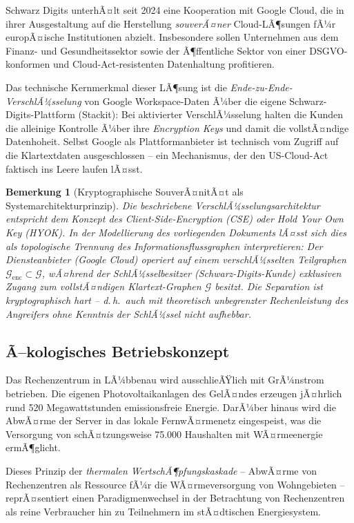 ﻿\documentclass[12pt, a4paper, openany]{report}
\newtheorem{remark}[theorem]{Bemerkung}
\newcommand{\calG}{\mathcal{G}}
\begin{document}
Schwarz Digits unterhÃ¤lt seit 2024 eine Kooperation mit Google Cloud, die
in ihrer Ausgestaltung auf die Herstellung \emph{souverÃ¤ner} Cloud-LÃ¶sungen
fÃ¼r europÃ¤ische Institutionen abzielt. Insbesondere sollen Unternehmen
aus dem Finanz- und Gesundheitssektor sowie der Ã¶ffentliche Sektor
von einer DSGVO-konformen und Cloud-Act-resistenten Datenhaltung profitieren.

Das technische Kernmerkmal dieser LÃ¶sung ist die \emph{Ende-zu-Ende-VerschlÃ¼sselung}
von Google Workspace-Daten Ã¼ber die eigene Schwarz-Digits-Plattform (Stackit):
Bei aktivierter VerschlÃ¼sselung halten die Kunden die alleinige Kontrolle
Ã¼ber ihre \textit{Encryption Keys} und damit die vollstÃ¤ndige Datenhoheit.
Selbst Google als Plattformanbieter ist technisch vom Zugriff auf die
Klartextdaten ausgeschlossen -- ein Mechanismus, der den US-Cloud-Act
faktisch ins Leere laufen lÃ¤sst.

\begin{remark}[Kryptographische SouverÃ¤nitÃ¤t als Systemarchitekturprinzip]
	\label{rem:crypto_sovereignty}
	Die beschriebene VerschlÃ¼sselungsarchitektur entspricht dem Konzept des
	\emph{Client-Side-Encryption} (CSE) oder \emph{Hold Your Own Key} (HYOK).
	In der Modellierung des vorliegenden Dokuments lÃ¤sst sich dies als
	topologische Trennung des Informationsflussgraphen interpretieren: Der
	Diensteanbieter (Google Cloud) operiert auf einem verschlÃ¼sselten
	Teilgraphen $\calG_{\text{enc}} \subset \calG$, wÃ¤hrend der
	SchlÃ¼sselbesitzer (Schwarz-Digits-Kunde) exklusiven Zugang zum
	vollstÃ¤ndigen Klartext-Graphen $\calG$ besitzt. Die Separation ist
	kryptographisch hart -- d.\,h.\ auch mit theoretisch unbegrenzter
	Rechenleistung des Angreifers ohne Kenntnis der SchlÃ¼ssel nicht aufhebbar.
\end{remark}

\subsection{Ã–kologisches Betriebskonzept}

Das Rechenzentrum in LÃ¼bbenau wird ausschlieÃŸlich mit GrÃ¼nstrom betrieben.
Die eigenen Photovoltaikanlagen des GelÃ¤ndes erzeugen jÃ¤hrlich rund
520 Megawattstunden emissionsfreie Energie. DarÃ¼ber hinaus wird die AbwÃ¤rme
der Server in das lokale FernwÃ¤rmenetz eingespeist, was die Versorgung von
schÃ¤tzungsweise 75.000 Haushalten mit WÃ¤rmeenergie ermÃ¶glicht.

Dieses Prinzip der \emph{thermalen WertschÃ¶pfungskaskade} -- AbwÃ¤rme von
Rechenzentren als Ressource fÃ¼r die WÃ¤rmeversorgung von Wohngebieten --
reprÃ¤sentiert einen Paradigmenwechsel in der Betrachtung von Rechenzentren
als reine Verbraucher hin zu Teilnehmern im stÃ¤dtischen Energiesystem.
\end{document}
